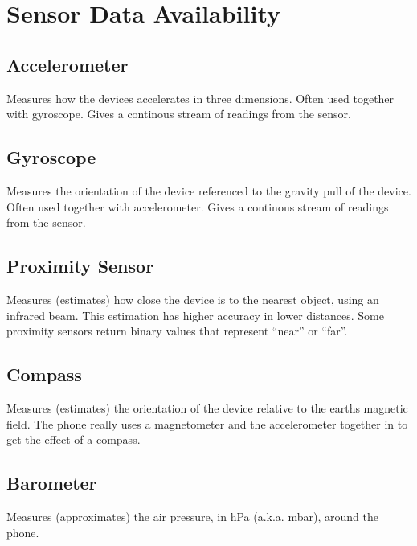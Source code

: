 
\section{Sensor Data Availability}
\label{sec:sensor_data_availability}



\subsection{Accelerometer}
\label{sub:accelerometer}
Measures how the devices accelerates in three dimensions. Often used together with gyroscope. Gives a continous stream of readings from the sensor.

\subsection{Gyroscope}
\label{sub:gyroscope}
Measures the orientation of the device referenced to the gravity pull of the device. Often used together with accelerometer. Gives a continous stream of readings from the sensor.

\subsection{Proximity Sensor}
\label{sub:proximity_sensor}
Measures (estimates) how close the device is to the nearest object, using an infrared beam. This estimation has higher accuracy in lower distances. Some proximity sensors return binary values that represent ``near'' or ``far''.

\subsection{Compass}
\label{sub:compass}
Measures (estimates) the orientation of the device relative to the earths magnetic field. The phone really uses a magnetometer and the accelerometer together in to get the effect of a compass. 

\subsection{Barometer}
\label{sub:barometer}
Measures (approximates) the air pressure, in hPa (a.k.a. mbar), around the phone.

